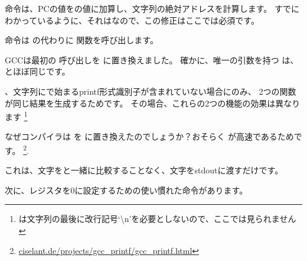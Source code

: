 命令は、\ac{PC}の値をの値に加算し、文字列の絶対アドレスを計算します。 
すでにわかっているように、それはなので、この修正はここでは必須です。

命令は \printf の代わりに \puts 関数を呼び出します。

\label{puts}

GCCは最初の \printf 呼び出しを \puts に置き換えました。 
確かに、唯一の引数を持つ \printf は、 \puts とほぼ同じです。

、文字列に\IT{\%}で始まるprintf形式識別子が含まれていない場合にのみ、
2つの関数が同じ結果を生成するためです。 その場合、これらの2つの機能の効果は異なります
\footnote{ \puts は文字列の最後に改行記号`\textbackslash{}n'を必要としないので、ここでは見られません}

なぜコンパイラは \printf を \puts に置き換えたのでしょうか？おそらく \puts が高速であるためです。
\footnote{\href{http://go.yurichev.com/17063}{ciselant.de/projects/gcc\_printf/gcc\_printf.html}}. 

これは、文字を\IT{\%}と一緒に比較することなく、文字を\gls{stdout}に渡すだけです。

次に、レジスタを0に設定するための使い慣れた命令があります。
